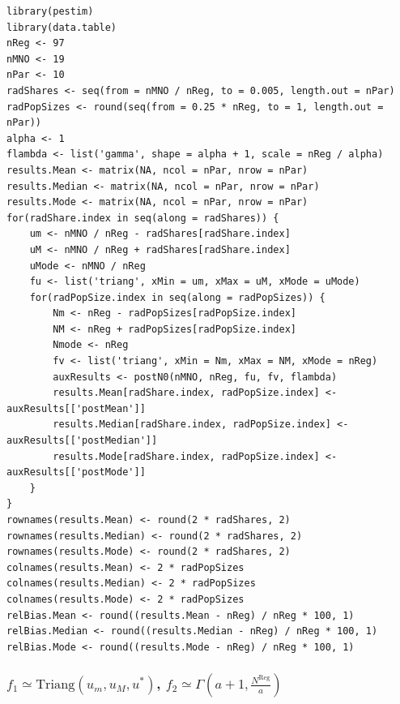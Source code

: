 \documentclass[12pt, a4paper]{article}
\begin{document}
\begin{verbatim}
library(pestim)
library(data.table)
nReg <- 97
nMNO <- 19
nPar <- 10
radShares <- seq(from = nMNO / nReg, to = 0.005, length.out = nPar)
radPopSizes <- round(seq(from = 0.25 * nReg, to = 1, length.out = nPar))
alpha <- 1
flambda <- list('gamma', shape = alpha + 1, scale = nReg / alpha)
results.Mean <- matrix(NA, ncol = nPar, nrow = nPar)
results.Median <- matrix(NA, ncol = nPar, nrow = nPar)
results.Mode <- matrix(NA, ncol = nPar, nrow = nPar)
for(radShare.index in seq(along = radShares)) {
    um <- nMNO / nReg - radShares[radShare.index]
    uM <- nMNO / nReg + radShares[radShare.index]
    uMode <- nMNO / nReg
    fu <- list('triang', xMin = um, xMax = uM, xMode = uMode)
    for(radPopSize.index in seq(along = radPopSizes)) {
        Nm <- nReg - radPopSizes[radPopSize.index]
        NM <- nReg + radPopSizes[radPopSize.index]
        Nmode <- nReg
        fv <- list('triang', xMin = Nm, xMax = NM, xMode = nReg)
        auxResults <- postN0(nMNO, nReg, fu, fv, flambda)
        results.Mean[radShare.index, radPopSize.index] <- auxResults[['postMean']] 
        results.Median[radShare.index, radPopSize.index] <- auxResults[['postMedian']]
        results.Mode[radShare.index, radPopSize.index] <- auxResults[['postMode']]
    }
}
rownames(results.Mean) <- round(2 * radShares, 2)
rownames(results.Median) <- round(2 * radShares, 2)
rownames(results.Mode) <- round(2 * radShares, 2)
colnames(results.Mean) <- 2 * radPopSizes
colnames(results.Median) <- 2 * radPopSizes
colnames(results.Mode) <- 2 * radPopSizes
relBias.Mean <- round((results.Mean - nReg) / nReg * 100, 1)
relBias.Median <- round((results.Median - nReg) / nReg * 100, 1)
relBias.Mode <- round((results.Mode - nReg) / nReg * 100, 1)
\end{verbatim}

\subsubsection{$f_{1}\simeq\textrm{Triang}(u_{m}, u_{M}, u^{*})$, $f_{2}\simeq\Gamma(a + 1, \frac{N^{\textrm{Reg}}}{a})$}
\end{document}
